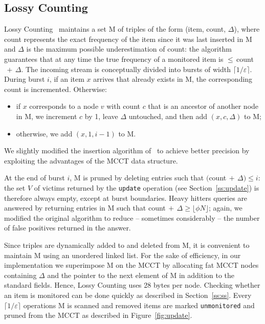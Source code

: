 \documentclass{sigplanconf}
\begin{document}
\subsection{Lossy Counting}
\label{ss:lc}

Lossy Counting~\cite{MM02} maintains a set M of triples of the form (item, count, $\Delta$), where count represents the exact frequency of the item since it was last inserted in M and $\Delta$ is the maximum possible underestimation of count: the algorithm guarantees that at any time the true frequency of a monitored item is $\leq\,$count$\,+\,\Delta$. The incoming stream is conceptually divided into bursts of width $\lceil 1/\varepsilon\rceil$.  During burst $i$, if an item $x$ arrives that already exists in M, the corresponding count is incremented. Otherwise:

\begin{itemize}
\item if $x$ corresponds to a node $v$ with count $c$ that is an ancestor of another node in M, we increment $c$ by 1, leave $\Delta$ untouched, and then add $(x, c, \Delta)$ to M;
\item otherwise, we add $(x, 1, i-1)$ to M.
\end{itemize}

\noindent We slightly modified the insertion algorithm of~\cite{MM02} to achieve better precision by exploiting the advantages of the MCCT data structure.

At the end of burst $i$, M is pruned by deleting entries such that $($count$\,+\,\Delta)\leq i$: the set $V$ of victims returned by the {\tt update} operation (see Section~\ref{ss:update}) is therefore always empty, except at burst boundaries. Heavy hitters queries are answered by returning entries in M such that count$\,+\,\Delta\geq \lfloor\phi N\rfloor$; again, we modified the original algorithm to reduce -- sometimes considerably -- the number of false positives returned in the answer.

Since triples are dynamically added to and deleted from M, it is convenient to maintain M using an unordered linked list. For the sake of efficiency, in our implementation we superimpose M on the MCCT by allocating fat MCCT nodes containing $\Delta$ and the pointer to the next element of M in addition to the standard fields. Hence, Lossy Counting uses 28 bytes per node. Checking whether an item is monitored can be done quickly as described in Section~\ref{ss:ss}. Every $\lceil 1/\varepsilon\rceil$ operations M is scanned and removed items are marked {\tt unmonitored} and pruned from the MCCT as described in Figure~\ref{fig:update}.
\end{document}
